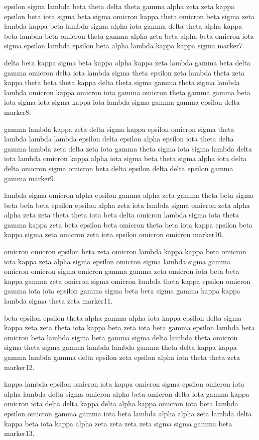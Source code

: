 \documentclass{article}
\begin{document}
epsilon sigma lambda beta theta delta theta gamma alpha zeta zeta kappa epsilon beta iota sigma beta sigma omicron kappa theta omicron beta sigma zeta lambda kappa beta lambda sigma alpha iota gamma delta theta alpha kappa beta lambda beta omicron theta gamma alpha zeta beta alpha beta omicron iota sigma epsilon lambda epsilon beta alpha lambda kappa kappa sigma marker7.

delta beta kappa sigma beta kappa alpha kappa zeta lambda gamma beta delta gamma omicron delta iota lambda sigma theta epsilon zeta lambda theta zeta kappa theta beta theta kappa delta theta sigma gamma theta sigma lambda lambda omicron kappa omicron iota gamma omicron theta gamma gamma beta iota sigma iota sigma kappa iota lambda sigma gamma gamma epsilon delta marker8.

gamma lambda kappa zeta delta sigma kappa epsilon omicron sigma theta lambda lambda lambda epsilon delta epsilon alpha epsilon iota theta delta gamma lambda zeta delta zeta iota gamma theta sigma iota sigma lambda delta iota lambda omicron kappa alpha iota sigma beta theta sigma alpha iota delta delta omicron sigma omicron beta delta epsilon delta delta epsilon gamma gamma marker9.

lambda sigma omicron alpha epsilon gamma alpha zeta gamma theta beta sigma beta beta beta epsilon epsilon alpha zeta iota lambda sigma omicron zeta alpha alpha zeta zeta theta theta iota beta delta omicron lambda sigma iota theta gamma kappa zeta beta epsilon beta omicron theta beta iota kappa epsilon beta kappa sigma zeta omicron zeta iota epsilon omicron omicron marker10.

omicron omicron epsilon beta zeta omicron lambda kappa kappa beta omicron iota kappa zeta alpha sigma epsilon omicron sigma lambda sigma gamma omicron omicron sigma omicron gamma gamma zeta omicron iota beta beta kappa gamma zeta omicron sigma omicron lambda theta kappa epsilon omicron gamma iota iota epsilon gamma sigma beta beta sigma gamma kappa kappa lambda sigma theta zeta marker11.

beta epsilon epsilon theta alpha gamma alpha iota kappa epsilon delta sigma kappa zeta zeta theta iota kappa beta zeta iota beta gamma epsilon lambda beta omicron beta lambda sigma beta gamma sigma delta lambda theta omicron sigma theta sigma gamma lambda lambda gamma theta delta kappa kappa gamma lambda gamma delta epsilon zeta epsilon alpha iota theta theta zeta marker12.

kappa lambda epsilon omicron iota kappa omicron sigma epsilon omicron iota alpha lambda delta sigma omicron alpha beta omicron delta iota gamma kappa omicron iota delta delta kappa delta alpha kappa omicron iota beta lambda epsilon omicron gamma gamma iota beta lambda alpha alpha zeta lambda delta kappa beta iota kappa alpha zeta zeta zeta zeta sigma sigma gamma beta marker13.
\end{document}
